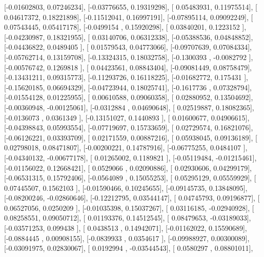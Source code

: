 \documentclass{article}
\begin{document}
       [-0.01602803,  0.07246234],
       [-0.03776655,  0.19319298],
       [ 0.05483931,  0.11975514],
       [ 0.04617372,  0.18221898],
       [-0.11512041,  0.16997191],
       [-0.07895114,  0.09092249],
       [ 0.07543445,  0.05417178],
       [-0.0499154 ,  0.15920298],
       [ 0.03840201,  0.1223152 ],
       [-0.04230987,  0.18321955],
       [ 0.03140706,  0.06312338],
       [-0.05388536,  0.04848852],
       [-0.04436822,  0.0489405 ],
       [ 0.01579543,  0.04773066],
       [-0.09707639,  0.07084334],
       [-0.05762714,  0.13159708],
       [-0.13324315,  0.18032758],
       [-0.1300393 , -0.0082792 ],
       [-0.00576742,  0.1269818 ],
       [ 0.04423561,  0.08843404],
       [-0.09081449,  0.08758479],
       [-0.13431211,  0.09315773],
       [-0.11293726,  0.16118225],
       [-0.01682772,  0.175431  ],
       [-0.15620185,  0.06694329],
       [-0.04723944,  0.18025741],
       [-0.1617736 ,  0.07328794],
       [-0.01554128,  0.01225955],
       [ 0.00610588,  0.09060358],
       [ 0.02880952,  0.13504692],
       [-0.00360948, -0.00125061],
       [-0.0312884 ,  0.04690648],
       [ 0.02519887,  0.18082365],
       [-0.0136073 ,  0.0361349 ],
       [-0.13151027,  0.1440893 ],
       [ 0.01600677,  0.04906615],
       [-0.04398843,  0.05993554],
       [-0.07719697,  0.15733659],
       [ 0.02729574,  0.16821076],
       [-0.06126221,  0.03393709],
       [ 0.02171559,  0.00887216],
       [ 0.05938045,  0.09136189],
       [ 0.02798018,  0.08471807],
       [-0.00200221,  0.14787916],
       [-0.06775255,  0.0484107 ],
       [-0.04340132, -0.00677178],
       [ 0.01265002,  0.1189821 ],
       [-0.05119484, -0.01215461],
       [-0.01156022,  0.12668421],
       [ 0.0529066 ,  0.02090886],
       [ 0.02930606,  0.04299179],
       [-0.06531315,  0.15792406],
       [-0.0564089 ,  0.15055253],
       [ 0.05295129,  0.05559929],
       [ 0.07445507,  0.1562103 ],
       [-0.01590466,  0.10245655],
       [-0.09145735,  0.13848095],
       [-0.08200246, -0.02860646],
       [-0.12212795,  0.03544147],
       [ 0.04745793,  0.09196877],
       [ 0.06527056,  0.0250209 ],
       [-0.01035398,  0.15037267],
       [ 0.03116185, -0.02940928],
       [ 0.08258551,  0.09050712],
       [ 0.01193376,  0.14512545],
       [ 0.08479653, -0.03189033],
       [-0.03571253,  0.099438  ],
       [ 0.0438513 ,  0.14942071],
       [-0.01162022,  0.15590689],
       [-0.0884445 ,  0.00908155],
       [-0.0839933 ,  0.0354617 ],
       [-0.09988927,  0.00300089],
       [-0.03091975,  0.02830067],
       [ 0.0192994 , -0.03544543],
       [ 0.0580297 ,  0.08801011],
\end{document}
